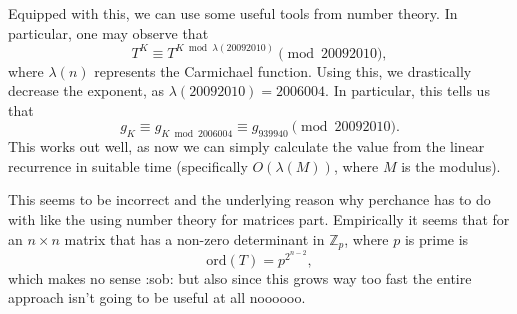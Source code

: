 \documentclass[a4paper, 12pt]{article}
\begin{document}
\begin{solution}
    Equipped with this, we can use some useful tools from number theory. In particular, one may observe that
    \[
        T^{K} \equiv T^{K \bmod{\lambda(20092010)}} \pmod{20092010}
    ,\]
    where \( \lambda(n) \) represents the Carmichael function. Using this, we drastically decrease the exponent, as \( \lambda(20092010) = 2006004 \). In particular, this tells us that
    \[
        g_{K} \equiv g_{K \bmod{2006004}} \equiv g_{939940} \pmod{20092010}
    .\]
    This works out well, as now we can simply calculate the value from the linear recurrence in suitable time (specifically \( O(\lambda{(M)}) \), where \( M \) is the modulus).

    \textcolor{WildStrawberry}{This seems to be incorrect and the underlying reason why perchance has to do with like the using number theory for matrices part.} Empirically it seems that for an \( n \times n \) matrix that has a non-zero determinant in \( \mathbb{Z}_p \), where \( p \) is prime is
    \[
        \mathrm{ord} (T) = p^{2^{n - 2}}
    ,\]
    which makes no sense :sob: but also since this grows way too fast the entire approach isn't going to be useful at all noooooo.
\end{solution}
\end{document}
